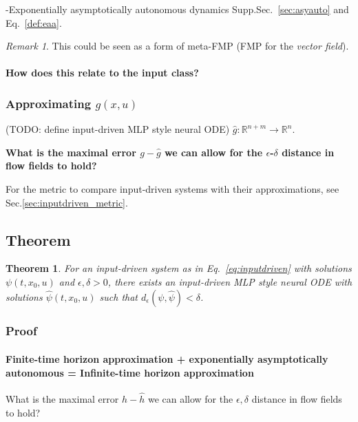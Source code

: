 \documentclass{article}
\newcommand{\ascomment}[1]{\textcolor{ascolor}{(#1)}}
\newtheorem{theorem}{Theorem}
\theoremstyle{definition} \newtheorem{definition}{Definition}
\theoremstyle{remark} \newtheorem{remark}{Remark}
\newcommand{\reals}{\mathbb{R}}
\newcounter{ct}
\begin{document}
-Exponentially asymptotically autonomous dynamics Supp.Sec.~\ref{sec:asyauto} and Eq.~\ref{def:eaa}.
%

\begin{remark}
This could be seen as a form of meta-FMP (FMP for the \emph{vector field}).
\end{remark}

\paragraph{How does this relate to the input class?}



\subsubsection{Approximating $g(x,u)$}
\ascomment{TODO: define input-driven MLP style neural ODE}
 $\hat g\colon \reals^{n+m} \rightarrow \reals^{n}$.

\textbf{What is the maximal error $g-\hat g$ we can allow for the $\epsilon$-$\delta$ distance in flow fields to hold?}

For the metric to compare input-driven systems with their approximations, see Sec.\ref{sec:inputdriven_metric}.








\subsection{Theorem}
\begin{theorem}
For an input-driven system as in Eq.~\ref{eq:inputdriven} %
with solutions  $\psi(t,x_0,u)$
and $\epsilon, \delta>0$, there exists an input-driven MLP style neural ODE %
with solutions  $\hat \psi(t,x_0,u)$ such that 
$d_\epsilon(\psi,\hat\psi)<\delta$.
\end{theorem}


\subsubsection{Proof}
\paragraph{Finite-time horizon approximation + exponentially asymptotically autonomous = Infinite-time horizon approximation}
What is the maximal error $h-\hat h$ we can allow for the $\epsilon,\delta$ distance in flow fields to hold?
\end{document}
